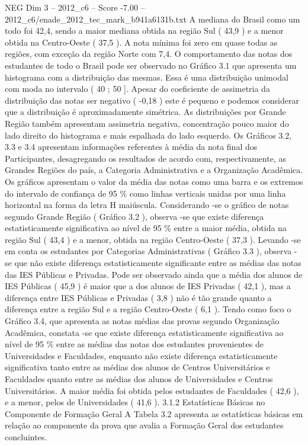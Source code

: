 \begin{textsample}{NEG Dim 3 – 2012\_c6 – Score -7.00 – 2012\_c6/enade\_2012\_tec\_mark\_b941a6131b.txt}
A mediana do Brasil como um todo foi 42,4, sendo a maior mediana obtida na região Sul ( 43,9 ) e a menor obtida na Centro-Oeste ( 37,5 ).
A nota mínima foi zero em quase todas as regiões, com exceção da região Norte com 7,4.
O comportamento das notas dos estudantes de todo o Brasil pode ser observado no Gráfico 3.1 que apresenta um histograma com a distribuição das mesmas.
Essa é uma distribuição unimodal com moda no intervalo ( 40 ; 50 ].
Apesar do coeficiente de assimetria da distribuição das notas ser negativo ( -0,18 ) este é pequeno e podemos considerar que a distribuição é aproximadamente simétrica.
As distribuições por Grande Região também apresentam assimetria negativa, concentração pouco maior do lado direito do histograma e mais espalhada do lado esquerdo.
Os Gráficos 3.2, 3.3 e 3.4 apresentam informações referentes à média da nota final dos Participantes, desagregando os resultados de acordo com, respectivamente, as Grandes Regiões do país, a Categoria Administrativa e a Organização Acadêmica.
Os gráficos apresentam o valor da média das notas como uma barra e os extremos do intervalo de confiança de 95 \% como linhas verticais unidas por uma linha horizontal na forma da letra H maiúscula.
Considerando -se o gráfico de notas segundo Grande Região ( Gráfico 3.2 ), observa -se que existe diferença estatisticamente significativa ao nível de 95 \% entre a maior média, obtida na região Sul ( 43,4 ) e a menor, obtida na região Centro-Oeste ( 37,3 ).
Levando -se em conta os estudantes por Categorias Administrativas ( Gráfico 3.3 ), observa -se que não existe diferença estatisticamente significante entre as médias das notas das IES Públicas e Privadas.
Pode ser observado ainda que a média dos alunos de IES Públicas ( 45,9 ) é maior que a dos alunos de IES Privadas ( 42,1 ), mas a diferença entre IES Públicas e Privadas ( 3,8 ) não é tão grande quanto a diferença entre a região Sul e a região Centro-Oeste ( 6,1 ).
Tendo como foco o Gráfico 3.4, que apresenta as notas médias das provas segundo Organização Acadêmica, constata -se que existe diferença estatisticamente significativa ao nível de 95 \% entre as médias das notas dos estudantes provenientes de Universidades e Faculdades, enquanto não existe diferença estatisticamente significativa tanto entre as médias dos alunos de Centros Universitários e Faculdades quanto entre as médias dos alunos de Universidades e Centros Universitários.
A maior média foi obtida pelos estudantes de Faculdades ( 42,6 ), e a menor, pelos de Universidades ( 41,6 ). 3.1.2 Estatísticas Básicas no Componente de Formação Geral A Tabela 3.2 apresenta as estatísticas básicas em relação ao componente da prova que avalia a Formação Geral dos estudantes concluintes.

\end{textsample}
